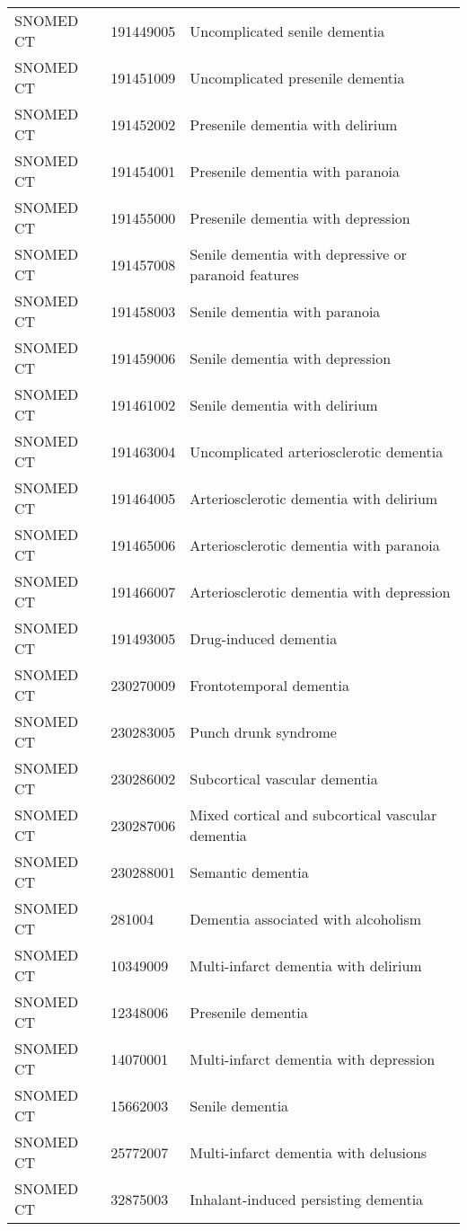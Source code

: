 \begin{longtable}{p{}p{}p{}}
  SNOMED CT & 191449005 & Uncomplicated senile dementia \\ 
  SNOMED CT & 191451009 & Uncomplicated presenile dementia \\ 
  SNOMED CT & 191452002 & Presenile dementia with delirium \\ 
  SNOMED CT & 191454001 & Presenile dementia with paranoia \\ 
  SNOMED CT & 191455000 & Presenile dementia with depression \\ 
  SNOMED CT & 191457008 & Senile dementia with depressive or paranoid features \\ 
  SNOMED CT & 191458003 & Senile dementia with paranoia \\ 
  SNOMED CT & 191459006 & Senile dementia with depression \\ 
  SNOMED CT & 191461002 & Senile dementia with delirium \\ 
  SNOMED CT & 191463004 & Uncomplicated arteriosclerotic dementia \\ 
  SNOMED CT & 191464005 & Arteriosclerotic dementia with delirium \\ 
  SNOMED CT & 191465006 & Arteriosclerotic dementia with paranoia \\ 
  SNOMED CT & 191466007 & Arteriosclerotic dementia with depression \\ 
  SNOMED CT & 191493005 & Drug-induced dementia \\ 
  SNOMED CT & 230270009 & Frontotemporal dementia \\ 
  SNOMED CT & 230283005 & Punch drunk syndrome \\ 
  SNOMED CT & 230286002 & Subcortical vascular dementia \\ 
  SNOMED CT & 230287006 & Mixed cortical and subcortical vascular dementia \\ 
  SNOMED CT & 230288001 & Semantic dementia \\ 
  SNOMED CT & 281004 & Dementia associated with alcoholism \\ 
  SNOMED CT & 10349009 & Multi-infarct dementia with delirium \\ 
  SNOMED CT & 12348006 & Presenile dementia \\ 
  SNOMED CT & 14070001 & Multi-infarct dementia with depression \\ 
  SNOMED CT & 15662003 & Senile dementia \\ 
  SNOMED CT & 25772007 & Multi-infarct dementia with delusions \\ 
  SNOMED CT & 32875003 & Inhalant-induced persisting dementia \\ 

\end{longtable}
